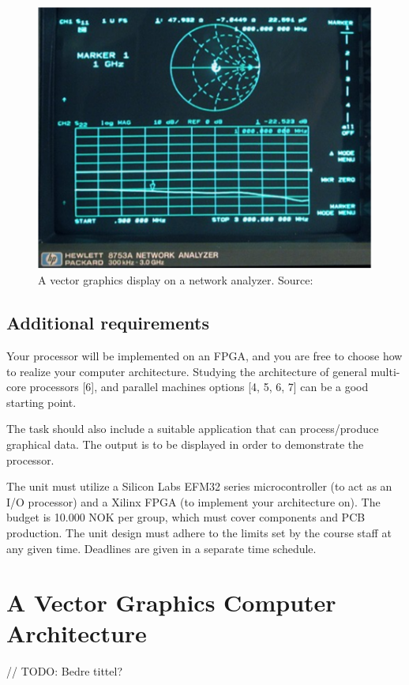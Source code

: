 \begin{figure}[h!]
    \centering
    \includegraphics[width=0.8\linewidth]{images/network-analyzer-vector-graphics-display.png}
    \caption{A vector graphics display on a network analyzer. Source: \cite{assignment-text}}
    \label{fig:vector-display-network-analyzer}
\end{figure}


\subsection{Additional requirements}

Your processor will be implemented on an FPGA, and you are free to choose how to realize your computer architecture.
Studying the architecture of general multi-core processors [6], and parallel machines options [4, 5, 6, 7] can be a good starting point.


The task should also include a suitable application that can process/produce graphical data.
The output is to be displayed in order to demonstrate the processor.

The unit must utilize a Silicon Labs EFM32 series microcontroller (to act as an I/O processor) and a Xilinx FPGA (to implement your architecture on).
The budget is 10.000 NOK per group, which must cover components and PCB production.
The unit design must adhere to the limits set by the course staff at any given time.
Deadlines are given in a separate time schedule.

\section{A Vector Graphics Computer Architecture}

// TODO: Bedre tittel?

